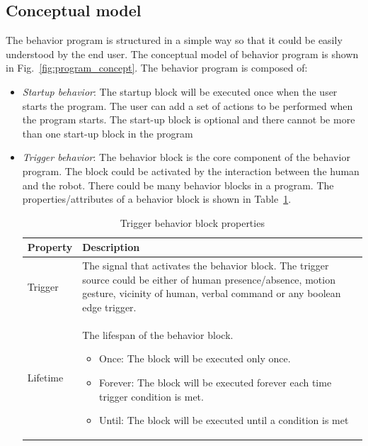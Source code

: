 \subsection{Conceptual model}
The behavior program is structured in a simple way so that it could be easily understood by the end user. The conceptual model of behavior program is shown in Fig.~\ref{fig:program_concept}. The behavior program is composed of:
\begin{itemize}
\item \emph{Startup behavior}: The startup block will be executed once when the user starts the program. The user can add a set of actions to be performed when the program starts. The start-up block is optional and there cannot be more than one start-up block in the program
\item \emph{Trigger behavior}: The behavior block is the core component of the behavior program. The block could be activated by the interaction between the human and the robot. There could be many behavior blocks in a program. The properties/attributes of a behavior block is shown in Table~\ref{table:behavior_block}.
\begin{table}[H]
\centering
\small
\caption{Trigger behavior block properties}
\label{table:behavior_block}
\begin{tabular}{|l|p{11cm}|}
\hline
  \textbf{Property} & \textbf{Description}
  \tabularnewline \hline
  
  Trigger & The signal that activates the behavior block. The trigger source could be either of human presence/absence, motion gesture, vicinity of human, verbal command or any boolean edge trigger.
                                          \tabularnewline\hline
                                          
  Lifetime & The lifespan of the behavior block. \begin{itemize}[leftmargin=*,topsep={0pt},itemsep={0pt},partopsep={0pt},parsep={0pt}]
                                                                      \item Once: The block will be executed only once.
                                                                      \item Forever: The block will be executed forever each time trigger condition is met.
                                                                      \item Until: The block will be executed until a condition is met
                                                                   \end{itemize}
                                          \tabularnewline\hline
  

\end{tabular}
\end{table}
\end{itemize}
